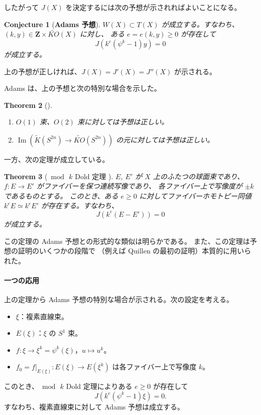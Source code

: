 \documentclass[uplatex,dvipdfmx,a4paper,12pt]{jlreq}
\newtheorem{theorem}{Theorem}
\newtheorem{conjecture}[theorem]{Conjecture}
\newcommand{\Z}{\mathbf{Z}}
\begin{document}
したがって $J(X)$ を決定するには次の予想が示されればよいことになる。

\begin{conjecture}[\textbf{Adams 予想}]
  $W(X) \subset T(X)$ が成立する。すなわち、
  $(k, y) \in \Z \times \widetilde{KO}(X)$ に対し、
  ある $e = e(k, y) \geq 0$ が存在して
  \[
    J(k^e(\psi^k - 1)y) = 0
  \]
  が成立する。
\end{conjecture}

上の予想が正しければ、$J(X) = J'(X) = J''(X)$ が示される。

Adams は、上の予想と次の特別な場合を示した。

\begin{theorem}[\cite{Ad63}]
  \begin{enumerate}
    \item $O(1)$ 束、$O(2)$ 束に対しては予想は正しい。
    \item $\operatorname{Im}(\tilde{K}(S^{2n}) \to \widetilde{KO}(S^{2n}))$
          の元に対しては予想は正しい。
  \end{enumerate}
\end{theorem}

一方、次の定理が成立している。

\begin{theorem}[$\bmod\, k$ Dold 定理 \cite{Ad63}]
  $E$, $E'$ が $X$ 上のふたつの球面束であり、
  $f : E \to E'$ がファイバーを保つ連続写像であり、
  各ファイバー上で写像度が $\pm k$ であるものとする。
  このとき、ある $e \geq 0$ に対してファイバーホモトピー同値
  $k^e E \simeq k^e E'$ が存在する。すなわち、
  \[
    J(k^e(E - E')) = 0
  \]
  が成立する。
\end{theorem}

この定理の Adams 予想との形式的な類似は明らかである。
また、この定理は予想の証明のいくつかの段階で
（例えば Quillen の最初の証明）本質的に用いられた。

\paragraph{一つの応用}

上の定理から Adams 予想の特別な場合が示される。次の設定を考える。
\begin{itemize}
  \item $\xi$：複素直線束。
  \item $E(\xi)$：$\xi$ の $S^1$ 束。
  \item $f : \xi \to \xi^k = \psi^k(\xi)$，$u \mapsto u^k$。
  \item $f_0 = f|_{E(\xi)} : E(\xi) \to E(\xi^k)$ は各ファイバー上で写像度 $k$。
\end{itemize}
このとき、$\bmod\, k$ Dold 定理によりある $e \geq 0$ が存在して
\[
  J(k^e(\psi^k - 1)\xi) = 0.
\]
すなわち、複素直線束に対して Adams 予想は成立する。
\end{document}
